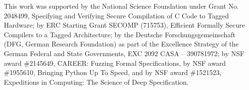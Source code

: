 \documentclass[10pt,conference]{ieeetran}%
\theoremstyle{definition}
\begin{document}
This work was supported by the National Science Foundation under Grant No. 2048499, Specifying and Verifying Secure Compilation of C Code to Tagged Hardware;
by ERC Starting Grant SECOMP (715753), Efficient Formally Secure Compilers to a Tagged Architecture;
by the Deutsche Forschungsgemeinschaft (DFG, German Research Foundation) as part of the Excellence Strategy of the German Federal and State Governments, EXC 2092 CASA -- 390781972;
by NSF award \#2145649, CAREER: Fuzzing Formal Specifications,
by
NSF award \#1955610, Bringing Python Up To Speed,
and by %
NSF award \#1521523, Expeditions in Computing: The Science of Deep
  Specification.




\end{document}
